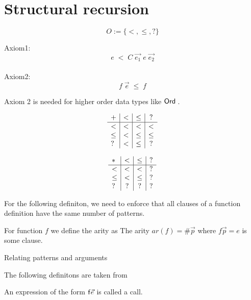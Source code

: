 \newcommand{\order}{\mathrm{Order}}
\section{Structural recursion}

\begin{definition}[Order]
\[ O := \{ < , \leq , ? \} \]
\end{definition}
Axiom1:
\[ e \; < \; C \; \vec{e_1} \; e \; \vec{e_2} \]
\\
Axiom2:
\[ f \; \vec{e} \; \leq \; f \] 

Axiom 2 is needed for higher order data types like $\mathsf{Ord}\;$.

\begin{definition}
\[
\begin{array}{l | c |c | c }

 +    &  <   &  \leq   &  ? \\
 \hline 
 <    &  <   & <       &  <   \\
 \leq &  <   & \leq    &  \leq \\
 ?    &  <   & \leq    &  ?
\end{array}
\]

\end{definition}


\begin{definition}
\[
\begin{array}{l | c |c | c}
 *   &  <  &  \leq & ? \\
\hline
  <   & <    & <    &   ? \\
 \leq & <    & \leq &   ?  \\
 ?    & ?    & ?    &   ?
\end{array}
\]
\end{definition}

For the following definiton, we need to enforce that all clauses of a function definition have the same number of patterns.
\begin{definition}
For function $f$ we define the arity as The arity $ar(f) = \# \vec{p} $ where $f \vec{p} = e $ is some clause.   
\end{definition}

\begin{definition}{Relating patterns and arguments}
\end{definition}

The following definitons are taken from \cite{abelAltenkirch:predStRec}

\begin{definition}
An expression of the form $\mathsf{f} \vec{e}$ is called a call.
\end{definition}

